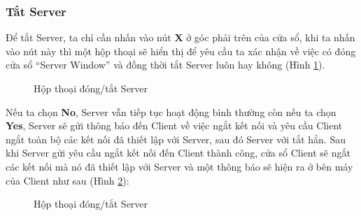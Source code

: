 \subsubsection{Tắt Server}
Để tắt Server, ta chỉ cần nhấn vào nút \textbf{X} ở góc phải trên của cửa sổ, khi ta nhấn vào nút này thì một hộp thoại sẽ hiển thị để yêu cầu ta xác nhận về việc có đóng cửa sổ ``Server Window'' và đồng thời tắt Server luôn hay không (Hình \ref{fig:ServerClosingDialog}). 

\begin{figure}[H]
	\caption{Hộp thoại đóng/tắt Server}
	\label{fig:ServerClosingDialog}
\end{figure}

Nếu ta chọn \textbf{No}, Server vẫn tiếp tục hoạt động bình thường còn nếu ta chọn \textbf{Yes}, Server sẽ gửi thông báo đến Client về việc ngắt kết nối và yêu cầu Client ngắt toàn bộ các kết nối đã thiết lập với Server, sau đó Server với tắt hẳn. Sau khi Server gửi yêu cầu ngắt kết nối đến Client thành công, cửa sổ Client sẽ ngắt các kết nối mà nó đã thiết lập với Server và một thông báo sẽ hiện ra ở bên máy của Client như sau (Hình \ref{fig:DisconnectedFromServer}):

\begin{figure}[H]
	\caption{Hộp thoại đóng/tắt Server}
	\label{fig:DisconnectedFromServer}
\end{figure}


